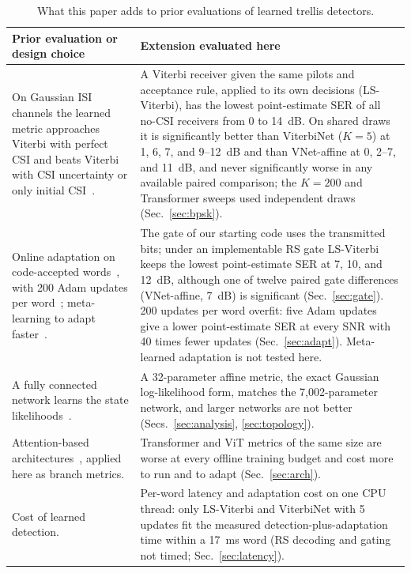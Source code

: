 \documentclass[journal]{IEEEtran}
\begin{document}
\begin{table}[t]
\centering
\caption{What this paper adds to prior evaluations of learned trellis detectors.}\label{tab:prior}
\footnotesize
\renewcommand{\arraystretch}{1.15}
\begin{tabular}{@{}>{\raggedright\arraybackslash}p{}>{\raggedright\arraybackslash}p{}@{}}
\toprule
Prior evaluation or design choice & Extension evaluated here \\
\midrule
On Gaussian ISI channels the learned metric approaches Viterbi with perfect CSI and beats Viterbi with CSI uncertainty or only initial CSI~\cite{shlezinger2020viterbinet}. & A Viterbi receiver given the same pilots and acceptance rule, applied to its own decisions (LS-Viterbi), has the lowest point-estimate SER of all no-CSI receivers from 0 to 14~dB. On shared draws it is significantly better than ViterbiNet ($K=5$) at 1, 6, 7, and 9--12~dB and than VNet-affine at 0, 2--7, and 11~dB, and never significantly worse in any available paired comparison; the $K=200$ and Transformer sweeps used independent draws (Sec.~\ref{sec:bpsk}). \\
Online adaptation on code-accepted words~\cite{shlezinger2020viterbinet}, with 200 Adam updates per word~\cite{raviv2023online}; meta-learning to adapt faster~\cite{raviv2021metaviterbinet,raviv2023online}. & The gate of our starting code uses the transmitted bits; under an implementable RS gate LS-Viterbi keeps the lowest point-estimate SER at 7, 10, and 12~dB, although one of twelve paired gate differences (VNet-affine, 7~dB) is significant (Sec.~\ref{sec:gate}). 200 updates per word overfit: five Adam updates give a lower point-estimate SER at every SNR with 40 times fewer updates (Sec.~\ref{sec:adapt}). Meta-learned adaptation is not tested here. \\
A fully connected network learns the state likelihoods~\cite{shlezinger2020viterbinet}. & A 32-parameter affine metric, the exact Gaussian log-likelihood form, matches the 7,002-parameter network, and larger networks are not better (Secs.~\ref{sec:analysis}, \ref{sec:topology}). \\
Attention-based architectures~\cite{vaswani2017attention,dosovitskiy2021vit}, applied here as branch metrics. & Transformer and ViT metrics of the same size are worse at every offline training budget and cost more to run and to adapt (Sec.~\ref{sec:arch}). \\
Cost of learned detection. & Per-word latency and adaptation cost on one CPU thread: only LS-Viterbi and ViterbiNet with 5 updates fit the measured detection-plus-adaptation time within a 17~ms word (RS decoding and gating not timed; Sec.~\ref{sec:latency}). \\

\end{tabular}
\end{table}
\end{document}
